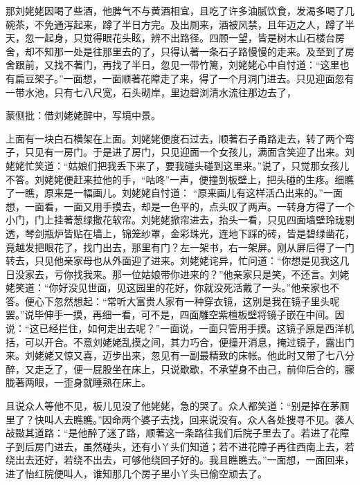 \begin{parag}
    那刘姥姥因喝了些酒，他脾气不与黄酒相宜，且吃了许多油腻饮食，发渴多喝了几碗茶，不免通泻起来，蹲了半日方完。及出厕来，酒被风禁，且年迈之人，蹲了半天，忽一起身，只觉得眼花头眩，辨不出路径。四顾一望，皆是树木山石楼台房舍，却不知那一处是往那里去的了，只得认著一条石子路慢慢的走来。及至到了房舍跟前，又找不著门，再找了半日，忽见一带竹篱，刘姥姥心中自忖道：“这里也有扁豆架子。”一面想，一面顺著花障走了来，得了一个月洞门进去。只见迎面忽有一带水池，只有七八尺宽，石头砌岸，里边碧浏清水流往那边去了，\begin{note}蒙侧批：借刘姥姥醉中，写境中景。\end{note}上面有一块白石横架在上面。刘姥姥便度石过去，顺著石子甬路走去，转了两个弯子，只见有一房门。于是进了房门，只见迎面一个女孩儿，满面含笑迎了出来。刘姥姥忙笑道：“姑娘们把我丢下来了，要我碰头碰到这里来。”说了，只觉那女孩儿不答。刘姥姥便赶来拉他的手，“咕咚”一声，便撞到板壁上，把头碰的生疼。细瞧了一瞧，原来是一幅画儿。刘姥姥自忖道： “原来画儿有这样活凸出来的。”一面想，一面看，一面又用手摸去，却是一色平的，点头叹了两声。一转身方得了一个小门，门上挂著葱绿撒花软帘。刘姥姥掀帘进去，抬头一看，只见四面墙壁玲珑剔透，琴剑瓶炉皆贴在墙上，锦笼纱罩，金彩珠光，连地下踩的砖，皆是碧绿凿花，竟越发把眼花了，找门出去，那里有门？左一架书，右一架屏。刚从屏后得了一门转去，只见他亲家母也从外面迎了进来。刘姥姥诧异，忙问道：“你想是见我这几日没家去，亏你找我来。那一位姑娘带你进来的？”他亲家只是笑，不还言。刘姥姥笑道：“你好没见世面，见这园里的花好，你就没死活戴了一头。”他亲家也不答。便心下忽然想起：“常听大富贵人家有一种穿衣镜，这别是我在镜子里头呢罢。”说毕伸手一摸，再细一看，可不是，四面雕空紫檀板壁将镜子嵌在中间。因说：“这已经拦住，如何走出去呢？”一面说，一面只管用手摸。这镜子原是西洋机括，可以开合。不意刘姥姥乱摸之间，其力巧合，便撞开消息，掩过镜子，露出门来。刘姥姥又惊又喜，迈步出来，忽见有一副最精致的床帐。他此时又带了七八分醉，又走乏了，便一屁股坐在床上，只说歇歇，不承望身不由己，前仰后合的，朦胧著两眼，一歪身就睡熟在床上。
\end{parag}


\begin{parag}
    且说众人等他不见，板儿见没了他姥姥，急的哭了。众人都笑道：“别是掉在茅厕里了？快叫人去瞧瞧。”因命两个婆子去找，回来说没有。众人各处搜寻不见。袭人敁敠其道路：“是他醉了迷了路，顺著这一条路往我们后院子里去了。若进了花障子到后房门进去，虽然碰头，还有小丫头们知道；若不进花障子再往西南上去，若绕出去还好，若绕不出去，可够他绕回子好的。我且瞧瞧去。”一面想，一面回来，进了怡红院便叫人，谁知那几个房子里小丫头已偷空顽去了。
\end{parag}


